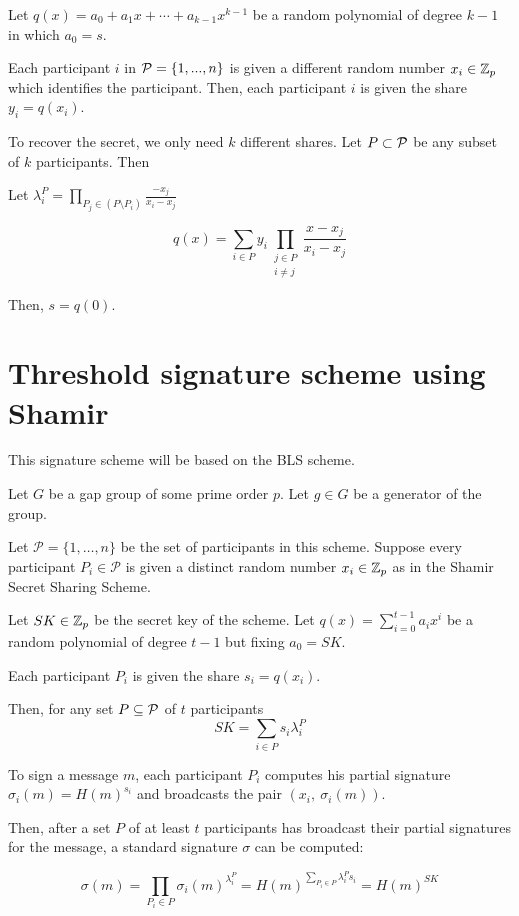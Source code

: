 Let $q(x) = a_0 + a_1 x + \cdots + a_{k-1} x^{k-1}$ be a random polynomial of degree $k-1$ in which $a_0 = s$.

Each participant $i$ in ${\mathcal P} = \{ 1, ... , n \}$ is given a different random number $x_i \in {\mathbb Z}_p$ which identifies the participant.
Then, each participant $i$ is given the share $y_i = q(x_i)$.

To recover the secret, we only need $k$ different shares. Let $P \subset {\mathcal P}$ be any subset of $k$ participants. Then

Let $\lambda_i^{P} = \prod_{P_j \in (P \setminus P_i)} \frac{-x_j}{x_i - x_j}$

$$
    q(x) = \sum_{i \in P} y_i \prod_{\substack{j \in P \\ i \neq j}} \frac{x-x_j}{x_i-x_j}
$$

Then, $s = q(0)$.

\section{Threshold signature scheme using Shamir}
\label{sec:shamir_sig}

This signature scheme will be based on the BLS scheme.

Let $G$ be a gap group of some prime order $p$. Let $g \in G$ be a generator of the group.

Let $\mathcal{P}= \{ 1, \dots , n \}$ be the set of participants in this scheme. Suppose every participant $P_i \in \mathcal{P}$ is given a distinct random number $x_i \in {\mathbb Z}_p$ as in the Shamir Secret Sharing Scheme.

Let $SK \in {\mathbb Z}_p$ be the secret key of the scheme. Let $q(x) = \sum_{i=0}^{t-1} a_i x^i$ be a random polynomial of degree $t-1$ but fixing $a_0 = SK$.

Each participant $P_i$ is given the share $s_i = q(x_i)$.

Then, for any set $P \subseteq {\mathcal P}$ of $t$ participants $$SK = \sum_{i \in P} s_i \lambda_i^P$$

To sign a message $m$, each participant $P_i$ computes his partial signature $\sigma_i (m) = H(m)^{s_i}$ and broadcasts the pair $(x_i, \ \sigma_i (m))$.

Then, after a set $P$ of at least $t$ participants has broadcast their partial signatures for the message, a standard signature $\sigma$ can be computed:

$$ \sigma (m) = \prod_{P_i \in P} \sigma_i (m)^{\lambda_i^{P}}= H(m)^{\sum_{P_i \in P} \lambda_i^P s_i} = H(m)^{SK}$$

